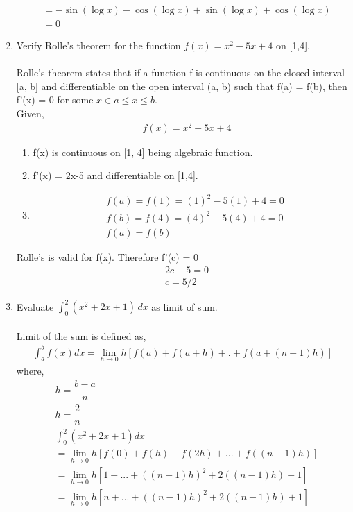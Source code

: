 \documentclass[journal,12pt,twocolumn]{IEEEtran}
\renewcommand\thesection{\arabic{section}}
\begin{document}
\begin{enumerate}[label=\thesection.\arabic*.,ref=\thesection.\theenumi]
\begin{align}
 &= -\sin(\log x)-\cos(\log x)+\sin(\log x)+\cos(\log x)\\
 &= 0
 \end{align}
 \item Verify Rolle's theorem for the function $ f(x) = x^2-5x+4 $ on [1,4].\\
 \solution\\
 Rolle's theorem states that if a function f is continuous on the closed interval [a, b] and differentiable on the open interval (a, b) such that f(a) = f(b), then f'(x) = 0 for some $x \in a \leq x \leq b.$ \\
 Given,
 \begin{align}
 & f(x) = x^2-5x+4
 \end{align}
 \begin{enumerate}
 \item f(x) is continuous on [1, 4] being algebraic function.\\
 \item f'(x) =  2x-5 and differentiable on [1,4].\\
 \item 
 \begin{align}
 &f(a) = f(1) = (1)^2 -5(1)+4 = 0\\
 &f(b) = f(4) = (4)^2 -5(4) +4 =0 \\
 & f(a) = f(b)
 \end{align}
 \end{enumerate}
Rolle's is valid for f(x). Therefore f'(c) = 0\\
 \begin{align}
 &2c -5 = 0\\
 &c= 5/2
 \end{align}
 \item Evaluate $ \int_{0}^{2} (x^2+2x+1)\, dx $ as limit of sum. \\
 \solution\\
 Limit of the sum is defined as,
 \begin{align}
  \int_{a}^{b} f(x) dx=\lim_{h \to0}h[f(a)+f(a+h)+.+f(a+(n-1)h)] 
 \end{align}
 where,
 \begin{align}
& h= \dfrac{b-a}{n}\\
 & h = \dfrac{2}{n}\\
 &\int_{0}^{2} (x^2+2x+1)dx\\
 &= \lim_{h \to0}h[f(0)+f(h)+f(2h)+...+f((n-1)h)]\\
 & = \lim_{h \to0}h[1+...+((n-1)h)^2+2((n-1)h)+1]\\
 &=  \lim_{h \to0}h[n+...+((n-1)h)^2+2((n-1)h)+1]\\

\end{align}
\end{enumerate}
\end{document}
